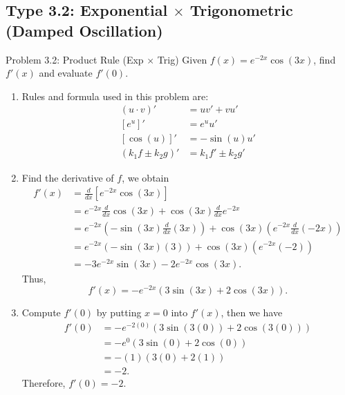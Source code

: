 \documentclass[11pt,a4paper]{article}
\begin{document}
\subsection{Type 3.2: Exponential $\times$ Trigonometric (Damped Oscillation)}
\begin{problembox}{Problem 3.2: Product Rule (Exp $\times$ Trig)}
Given $f(x) = e^{-2x}\cos(3x)$, find $f'(x)$ and evaluate $f'(0)$.
\end{problembox}
\begin{solutionbox}
\begin{enumerate}
	\item [Step 1.] Rules and formula used in this problem are:
	\begin{align*}
		(u \cdot v)' &= u v' + v u' \\
		[e^u]' &= e^u u' \\
		[\cos(u)]' &= -\sin(u) u' \\
		(k_1f \pm k_2 g)' &= k_1f' \pm k_2g'
	\end{align*}
	
	\item [Step 2.] Find the derivative of $f$, we obtain
	\begin{align*}
		f'(x) &= \frac{d}{dx} \left[ e^{-2x}\cos(3x) \right] \\
		&= e^{-2x} \frac{d}{dx} \cos(3x) + \cos(3x) \frac{d}{dx} e^{-2x} \\
		&= e^{-2x} \left( -\sin(3x) \frac{d}{dx}(3x) \right) + \cos(3x) \left( e^{-2x} \frac{d}{dx}(-2x) \right) \\
		&= e^{-2x} ( -\sin(3x) (3) ) + \cos(3x) ( e^{-2x} (-2) ) \\
		&= -3e^{-2x}\sin(3x) - 2e^{-2x}\cos(3x).
	\end{align*}
	Thus,
	\begin{equation*}
		f'(x) = -e^{-2x}(3\sin(3x) + 2\cos(3x)).
	\end{equation*}
	
	\item [Step 3.] Compute $f'(0)$ by putting $x = 0$ into $f'(x)$, then we have
	\begin{align*}
		f'(0) &= -e^{-2(0)}(3\sin(3(0)) + 2\cos(3(0))) \\
		&= -e^{0}(3\sin(0) + 2\cos(0)) \\
		&= -(1)(3(0) + 2(1)) \\
		&= -2.
	\end{align*}
	Therefore, $f'(0) = -2$.
\end{enumerate}
\end{solutionbox}
\end{document}

